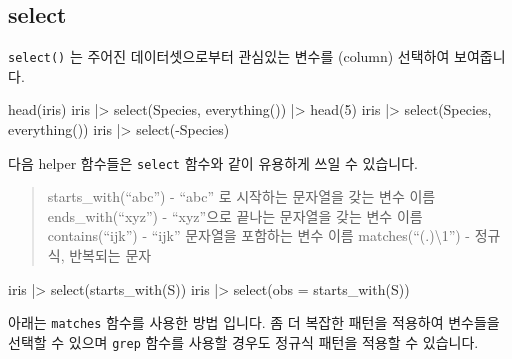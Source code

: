 \documentclass[
  a4paper,
]{book}
\newenvironment{Shaded}{\begin{snugshade}}{\end{snugshade}}
\newcommand{\AttributeTok}[1]{\textcolor[rgb]{0.40,0.45,0.13}{#1}}
\newcommand{\DecValTok}[1]{\textcolor[rgb]{0.68,0.00,0.00}{#1}}
\newcommand{\FunctionTok}[1]{\textcolor[rgb]{0.28,0.35,0.67}{#1}}
\newcommand{\NormalTok}[1]{\textcolor[rgb]{0.00,0.23,0.31}{#1}}
\newcommand{\SpecialCharTok}[1]{\textcolor[rgb]{0.37,0.37,0.37}{#1}}
\newcommand{\StringTok}[1]{\textcolor[rgb]{0.13,0.47,0.30}{#1}}
\begin{document}
\hypertarget{select}{%
\subsection{select}\label{select}}

\texttt{select()} 는 주어진 데이터셋으로부터 관심있는 변수를 (column)
선택하여 보여줍니다.

\begin{Shaded}
\begin{Highlighting}[]
\FunctionTok{head}\NormalTok{(iris)}
\NormalTok{iris }\SpecialCharTok{|\textgreater{}} 
  \FunctionTok{select}\NormalTok{(Species, }\FunctionTok{everything}\NormalTok{()) }\SpecialCharTok{|\textgreater{}} 
  \FunctionTok{head}\NormalTok{(}\DecValTok{5}\NormalTok{)}
\NormalTok{iris }\SpecialCharTok{|\textgreater{}} \FunctionTok{select}\NormalTok{(Species, }\FunctionTok{everything}\NormalTok{())}
\NormalTok{iris }\SpecialCharTok{|\textgreater{}} \FunctionTok{select}\NormalTok{(}\SpecialCharTok{{-}}\NormalTok{Species)}
\end{Highlighting}
\end{Shaded}

다음 helper 함수들은 \texttt{select} 함수와 같이 유용하게 쓰일 수
있습니다.

\begin{quote}
starts\_with(``abc'') - ``abc'' 로 시작하는 문자열을 갖는 변수 이름
ends\_with(``xyz'') - ``xyz''으로 끝나는 문자열을 갖는 변수 이름
contains(``ijk'') - ``ijk'' 문자열을 포함하는 변수 이름
matches(``(.)\textbackslash1'') - 정규식, 반복되는 문자
\end{quote}

\begin{Shaded}
\begin{Highlighting}[]
\NormalTok{iris }\SpecialCharTok{|\textgreater{}} \FunctionTok{select}\NormalTok{(}\FunctionTok{starts\_with}\NormalTok{(}\StringTok{\textquotesingle{}S\textquotesingle{}}\NormalTok{))}
\NormalTok{iris }\SpecialCharTok{|\textgreater{}} \FunctionTok{select}\NormalTok{(}\AttributeTok{obs =} \FunctionTok{starts\_with}\NormalTok{(}\StringTok{\textquotesingle{}S\textquotesingle{}}\NormalTok{))}
\end{Highlighting}
\end{Shaded}

아래는 \texttt{matches} 함수를 사용한 방법 입니다. 좀 더 복잡한 패턴을
적용하여 변수들을 선택할 수 있으며 \texttt{grep} 함수를 사용할 경우도
정규식 패턴을 적용할 수 있습니다.
\end{document}
